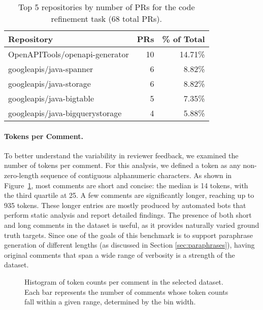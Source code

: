 \begin{table}[ht]
	\centering
	\begin{tabular}{lrr}
		\toprule
		\textbf{Repository}             & \textbf{PRs} & \textbf{\% of Total} \\
		\midrule
		OpenAPITools/openapi-generator  & 10           & 14.71\%              \\
		googleapis/java-spanner         & 6            & 8.82\%               \\
		googleapis/java-storage         & 6            & 8.82\%               \\
		googleapis/java-bigtable        & 5            & 7.35\%               \\
		googleapis/java-bigquerystorage & 4            & 5.88\%               \\
		\bottomrule
	\end{tabular}
	\caption{Top 5 repositories by number of PRs for the code refinement task (68 total PRs).}
	\label{tab:top-repos-refinement}
\end{table}

\paragraph{Tokens per Comment.}
To better understand the variability in reviewer feedback, we examined the number of tokens per
comment. For this analysis, we defined a token as any non-zero-length sequence of contiguous
alphanumeric characters. As shown in Figure~\ref{fig:token-histograms}, most comments are short and
concise: the median is 14 tokens, with the third quartile at 25. A few comments are significantly
longer, reaching up to 935 tokens. These longer entries are mostly produced by automated bots that
perform static analysis and report detailed findings. The presence of both short and long comments
in the dataset is useful, as it provides naturally varied ground truth targets. Since one of the
goals of this benchmark is to support paraphrase generation of different lengths (as discussed in
Section \ref{sec:paraphrases}), having original comments that span a wide range of verbosity is a
strength of the dataset.

\begin{figure}[ht]
	\centering

	\caption{Histogram of token counts per comment in the selected dataset. Each bar represents the
		number of comments whose token counts fall within a given range, determined by the bin width.}
	\label{fig:token-histograms}
\end{figure}

